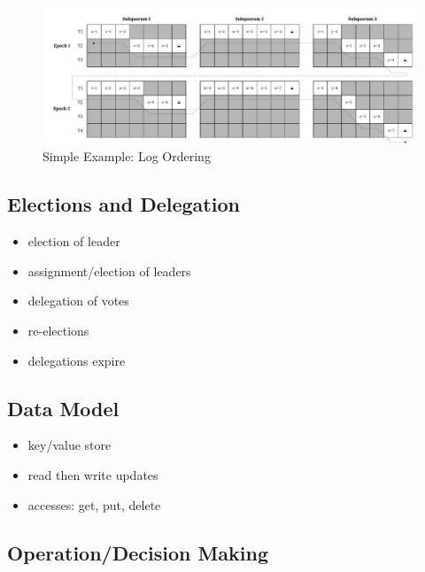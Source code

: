 \documentclass[10pt,twocolumn]{article}
\begin{document}
\begin{figure}
    \centering
    \minipage{\textwidth}
    \includegraphics[width=\linewidth]{figures/simple_example_log_ordering}
    \caption{Simple Example: Log Ordering}
    \label{fig:simple_example_log_ordering}
    \endminipage
\end{figure}

\subsection*{Elections and Delegation}

\begin{itemize}
    \item election of \roo leader
    \item assignment/election of \sub leaders
    \item delegation of votes
    \item re-elections
    \item delegations expire
\end{itemize}

\subsection*{Data Model}


\begin{itemize}
    \item key/value store
    \item read then write updates 
    \item accesses: get, put, delete
\end{itemize}

\subsection*{Operation/Decision Making}
\end{document}
